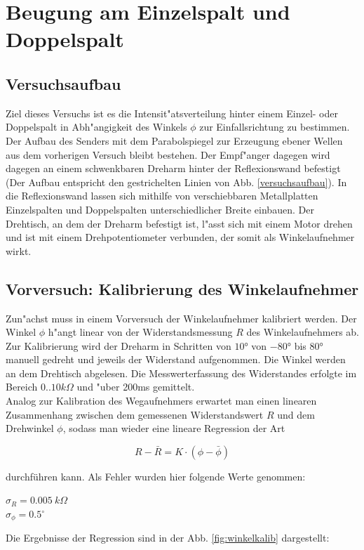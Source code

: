 \documentclass[12pt,a4paper]{article}
\begin{document}
\section{Beugung am Einzelspalt und Doppelspalt}

\subsection{Versuchsaufbau}
Ziel dieses Versuchs ist es die Intensit"atsverteilung hinter einem Einzel- oder Doppelspalt in Abh"angigkeit des Winkels $\phi$ zur Einfallsrichtung zu bestimmen. Der Aufbau des Senders mit dem Parabolspiegel zur Erzeugung ebener Wellen aus dem vorherigen Versuch bleibt bestehen. Der Empf"anger dagegen wird dagegen an einem schwenkbaren Dreharm hinter der Reflexionswand befestigt (Der Aufbau entspricht den gestrichelten Linien von Abb. \ref{versuchsaufbau}). In die Reflexionswand lassen sich mithilfe von verschiebbaren Metallplatten Einzelspalten und Doppelspalten unterschiedlicher Breite einbauen. Der Drehtisch, an dem der Dreharm befestigt ist, l"asst sich mit einem Motor drehen und ist mit einem Drehpotentiometer verbunden, der somit als Winkelaufnehmer wirkt. 

\subsection{Vorversuch: Kalibrierung des Winkelaufnehmer}
Zun"achst muss in einem Vorversuch der Winkelaufnehmer kalibriert werden. Der Winkel $\phi$ h"angt linear von der Widerstandsmessung $R$ des Winkelaufnehmers ab. Zur Kalibrierung wird der Dreharm in Schritten von $\ang{10}$ von $\ang{-80}$ bis $\ang{80}$ manuell gedreht und jeweils der Widerstand aufgenommen. Die Winkel werden an dem Drehtisch abgelesen. Die Messwerterfassung des Widerstandes erfolgte im Bereich $0..10k\Omega$ und "uber 200ms gemittelt.\\
Analog zur Kalibration des Wegaufnehmers erwartet man einen linearen Zusammenhang zwischen dem gemessenen Widerstandswert $R$ und dem Drehwinkel $\phi$, sodass man wieder eine lineare Regression der Art

\begin{equation}
	R-\bar{R}=K\cdot(\phi-\bar{\phi})
\end{equation}

durchführen kann. Als Fehler wurden hier folgende Werte genommen:
\begin{center}
	$\sigma_R = \SI{0.005}{k \Omega}$\\
	$\sigma_{\phi} = 0.5^\circ$
\end{center}
Die Ergebnisse der Regression sind in der Abb. \ref{fig:winkelkalib} dargestellt:
\end{document}

